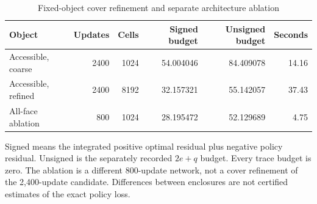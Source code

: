 \begin{table}[htbp]\centering\small
\caption{Fixed-object cover refinement and separate architecture ablation}\label{tab:supprefinement}
\begin{tabular}{lrrrrr}
\toprule
Object & Updates & Cells & Signed budget & Unsigned budget & Seconds\\\midrule
Accessible, coarse & 2400 & 1024 & 54.004046 & 84.409078 & 14.16\\
Accessible, refined & 2400 & 8192 & 32.157321 & 55.142057 & 37.43\\
All-face ablation & 800 & 1024 & 28.195472 & 52.129689 & 4.75\\
\bottomrule\end{tabular}
\par\smallskip\footnotesize Signed means the integrated positive optimal residual plus negative policy residual. Unsigned is the separately recorded $2e+q$ budget. Every trace budget is zero. The ablation is a different 800-update network, not a cover refinement of the 2,400-update candidate. Differences between enclosures are not certified estimates of the exact policy loss.
\end{table}

